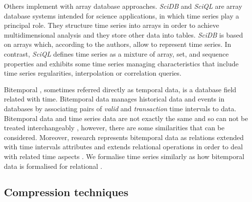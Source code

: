  
Others implement  with array database approaches.
\emph{SciDB} \cite{stonebraker09:scidb} and \emph{SciQL}
\cite{zhang11} are array database systems intended for science
applications, in which time series play a principal role. They
structure time series into arrays in order to achieve multidimensional
analysis and they store other data into tables.  \emph{SciDB} is based
on arrays which, according to the authors, allow to represent time
series.  In contrast, \emph{SciQL} defines time series as a mixture of
array, set, and sequence properties and exhibits some time series
managing characteristics that include time series regularities,
interpolation or correlation queries.





Bitemporal , sometimes referred directly as temporal data,
is a database field related with time. Bitemporal data manages
historical data and events in databases by associating pairs of
\emph{valid} and \emph{transaction} time intervals to data.
Bitemporal data and time series data are not exactly the same and so
can not be treated interchangeably \cite{schmidt95}, however, there
are some similarities that can be considered. Moreover, 
research represents bitemporal data as relations extended with time
intervals attributes and extends relational operations in order to
deal with related time aspects
\cite{jensen99:temporaldata,date02:_tempor_data_relat_model}.  We
formalise time series similarly as how bitemporal data is formalised
for relational .



\subsection{Compression techniques}





